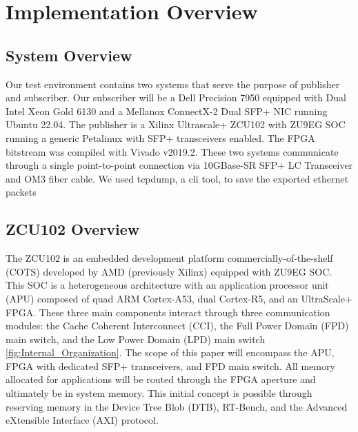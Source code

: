 \chapter{Implementation Overview}
\label{chapter: implementation_overview}
\section{System Overview}
Our test environment contains two systems that serve the purpose of publisher and subscriber. Our subscriber will be a Dell Precision 7950 equipped with Dual Intel Xeon Gold 6130 and a Mellanox ConnectX-2 Dual SFP+ NIC running Ubuntu 22.04. The publisher is a Xilinx Ultrascale+ ZCU102 with ZU9EG SOC running a generic Petalinux with SFP+ transceivers enabled. The FPGA bitstream was compiled with Vivado v2019.2. These two systems communicate through a single point-to-point connection via 10GBase-SR SFP+ LC Transceiver and OM3 fiber cable. We used tcpdump, a cli tool, to save the exported ethernet packets 


\section{ZCU102 Overview}
The ZCU102 is an embedded development platform commercially-of-the-shelf (COTS) developed by AMD (previously Xilinx) equipped with ZU9EG SOC. 
This SOC is a heterogeneous architecture with an application processor unit (APU) composed of quad ARM Cortex-A53, dual Cortex-R5, and an UltraScale+ FPGA. 
These three main components interact through three communication modules: the Cache Coherent Interconnect (CCI), the Full Power Domain (FPD) main switch, and the Low Power Domain (LPD) main switch \ref{fig:Internal_Organization}. 
The scope of this paper will encompass the APU, FPGA with dedicated SFP+ transceivers, and FPD main switch. 
All memory allocated for applications will be routed through the FPGA aperture and ultimately be in system memory. 
This initial concept is possible through reserving memory in the Device Tree Blob (DTB), RT-Bench, and the Advanced eXtensible Interface (AXI) protocol.




